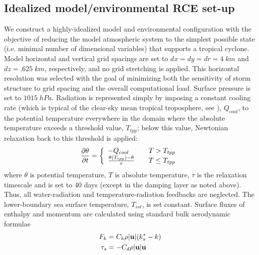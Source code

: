 \documentclass[12pt]{article}
\begin{document}
\subsection{Idealized model/environmental RCE set-up}
We construct a highly-idealized model and environmental configuration with the objective of reducing the model atmospheric system to the simplest possible state (i.e. minimal number of dimensional variables) that supports a tropical cyclone. Model horizontal and vertical grid spacings are set to $dx = dy = dr = 4 \; km$ and $dz = .625 \; km$, respectively, and no grid stretching is applied. This horizontal resolution was selected with the goal of minimizing both the sensitivity of storm structure to grid spacing and the overall computational load. Surface pressure is set to $1015 \; hPa$. Radiation is represented simply by imposing a constant cooling rate (which is typical of the clear-sky mean tropical troposphere, see \cite{Hartmann_Holton_Fu_2001}), $Q_{cool}$, to the potential temperature everywhere in the domain where the absolute temperature exceeds a threshold value, $T_{tpp}$; below this value, Newtonian relaxation back to this threshold is applied:
\begin{equation}
\label{eq:radscheme}
\frac{\partial \theta}{\partial t} = \left\{ 
\begin{array}{l l}
  - Q_{cool} & \quad \mbox{$T > T_{tpp}$}\\
  \frac{\theta(T_{tpp})-\theta}{\tau} & \quad \mbox{$T \le T_{tpp}$}\\
  \end{array} \right.
\end{equation}
where $\theta$ is potential temperature, $T$ is absolute temperature, $\tau$ is the relaxation timescale and is set to $40$ days (except in the damping layer as noted above). Thus, all water-radiation and temperature-radiation feedbacks are neglected. The lower-boundary sea surface temperature, $T_{sst}$, is set constant. Surface fluxes of enthalpy and momentum are calculated using standard bulk aerodynamic formulae
\begin{align}
	\label{eq:enthalpyflux}
	F_k &= C_k \rho |{\bf u}|(k^*_s-k) \\
	\label{eq:sfcstress}
	\tau_s &= -C_d \rho |{\bf u}|{\bf u}
\end{align}
\end{document}

